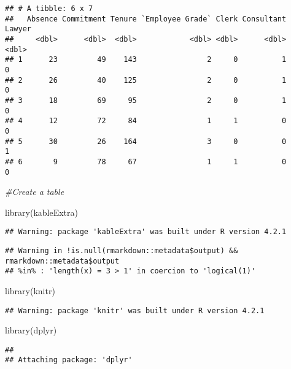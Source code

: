 \documentclass[
]{article}
\newenvironment{Shaded}{\begin{snugshade}}{\end{snugshade}}
\newcommand{\CommentTok}[1]{\textcolor[rgb]{0.56,0.35,0.01}{\textit{#1}}}
\newcommand{\FunctionTok}[1]{\textcolor[rgb]{0.00,0.00,0.00}{#1}}
\newcommand{\NormalTok}[1]{#1}
\begin{document}
\begin{verbatim}
## # A tibble: 6 x 7
##   Absence Commitment Tenure `Employee Grade` Clerk Consultant Lawyer
##     <dbl>      <dbl>  <dbl>            <dbl> <dbl>      <dbl>  <dbl>
## 1      23         49    143                2     0          1      0
## 2      26         40    125                2     0          1      0
## 3      18         69     95                2     0          1      0
## 4      12         72     84                1     1          0      0
## 5      30         26    164                3     0          0      1
## 6       9         78     67                1     1          0      0
\end{verbatim}

\begin{Shaded}
\begin{Highlighting}[]
\CommentTok{\#Create a table}

\FunctionTok{library}\NormalTok{(kableExtra)}
\end{Highlighting}
\end{Shaded}

\begin{verbatim}
## Warning: package 'kableExtra' was built under R version 4.2.1
\end{verbatim}

\begin{verbatim}
## Warning in !is.null(rmarkdown::metadata$output) && rmarkdown::metadata$output
## %in% : 'length(x) = 3 > 1' in coercion to 'logical(1)'
\end{verbatim}

\begin{Shaded}
\begin{Highlighting}[]
\FunctionTok{library}\NormalTok{(knitr)}
\end{Highlighting}
\end{Shaded}

\begin{verbatim}
## Warning: package 'knitr' was built under R version 4.2.1
\end{verbatim}

\begin{Shaded}
\begin{Highlighting}[]
\FunctionTok{library}\NormalTok{(dplyr)}
\end{Highlighting}
\end{Shaded}

\begin{verbatim}
## 
## Attaching package: 'dplyr'
\end{verbatim}
\end{document}
